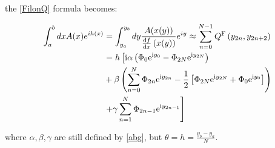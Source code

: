 the \eqref{FilonQ} formula becomes:

\begin{equation}
    \begin{aligned}
        \int_{a}^{b}dxA(x)e^{ih(x)} &= \int_{y_a}^{y_b}dy\frac{A(x(y))}{\dv{f}{x}\left(x(y)\right)}e^{iy} \approx \sum_{n=0}^{N-1} Q^{\text {F}}\left(y_{2 n}, y_{2 n+2}\right) \\
        &= h\left[\mathrm{i} \alpha\left(\Phi_{0} \mathrm{e}^{\mathrm{i}  y_{0}}-\Phi_{2 N} \mathrm{e}^{\mathrm{i}  y_{2 N}}\right)\right.\\
        &+\beta\left(\sum_{n=0}^{N} \Phi_{2 n} \mathrm{e}^{\mathrm{i}  y_{2 n}}-\frac{1}{2}\left[\Phi_{2 N} \mathrm{e}^{\mathrm{i}  y_{2 N}}+\Phi_{0} \mathrm{e}^{\mathrm{i}  y_{0}}\right]\right) \\
        &\left.+\gamma \sum_{n=1}^{N} \Phi_{2 n-1} \mathrm{e}^{\mathrm{i}  y_{2 n-1}}\right] \\
    \end{aligned} \label{FilonVarQ}
\end{equation} 

\vspace{0.25in}

where $\alpha, \beta, \gamma$ are still defined by \eqref{abg}, but  $\theta=h=\frac{y_b-y_a}{N}$. 

